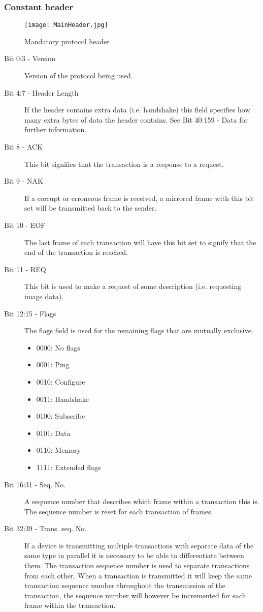 \subsubsection{Constant header}
\begin{figure}
\centering
\texttt{[image: MainHeader.jpg]}
\caption{Mandatory protocol header}
\label{fig:MainHeader}
\end{figure}
\begin{description}
\item [Bit 0:3 - Version] Version of the protocol being used.
\item [Bit 4:7 - Header Length] If the header contains extra data (i.e. handshake) this field  specifies how many extra bytes of data the header contains. See Bit 40:159 - Data for further information.
\item [Bit 8 - ACK] This bit signifies that the transaction is a response to a request.
\item [Bit 9 - NAK] If a corrupt or erroneous frame is received, a mirrored frame with this bit set will be transmitted back to the sender.
\item [Bit 10 - EOF] The last frame of each transaction will have this bit set to signify that the end of the transaction is reached.
\item [Bit 11 - REQ] This bit is used to make a request of some description (i.e. requesting image data).
\item [Bit 12:15 - Flags] The flags field is used for the remaining flags that are mutually exclusive.
	\begin{itemize}
	\item 0000: No flags
	\item 0001: Ping
	\item 0010: Configure
	\item 0011: Handshake
	\item 0100: Subscribe
	\item 0101: Data
	\item 0110: Memory
	\item 1111: Extended flags
	\end{itemize}
\item [Bit 16:31 - Seq. No.] A sequence number that describes which frame within a transaction this is. The sequence number is reset for each transaction of frames.
\item [Bit 32:39 - Trans. seq. No.] If a device is transmitting multiple transactions with separate data of the same type in parallel it is necessary to be able to differentiate between them. The transaction sequence number is used to separate transactions from each other. When a transaction is transmitted it will keep the same transaction sequence number throughout the transmission of the transaction, the sequence number will however be incremented for each frame within the transaction.

\end{description}
